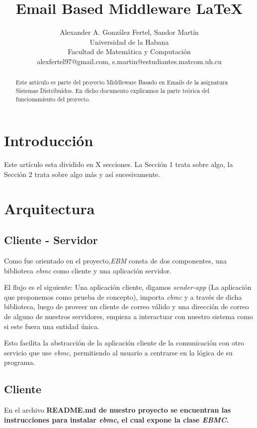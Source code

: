 \documentclass[a4paper]{article}
\title{Email Based Middleware \LaTeX}
\author{Alexander A. González Fertel, Sandor Martín \\
  \small Universidad de la Habana\\
  \small Facultad de Matemática y Computación\\
  \small alexfertel97@gmail.com, s.martin@estudiantes.matcom.uh.cu
  \date{}
}
\begin{document}
\maketitle

\begin{abstract}
	
Este artículo es parte del proyecto Middleware Basado en Emails de la asignatura Sistemas Distribuidos.
En dicho documento explicamos la parte teórica del funcionamiento del proyecto.

\end{abstract}

\section{Introducci\'on}

Este artículo esta dividido en X secciones. La Sección 1 trata sobre algo, la Sección 2 trata sobre algo más y así sucesivamente.

\section{Arquitectura}
	\subsection{Cliente - Servidor}
	Como fue orientado en el proyecto,\emph{EBM} consta de dos componentes, una biblioteca \emph{ebmc} como cliente y una aplicación servidor.
	
	El flujo es el siguiente: Una aplicación cliente, digamos \emph{sender-app} (La aplicación que proponemos como prueba de concepto), importa \emph{ebmc} y a través de dicha biblioteca, luego de proveer un cliente de correo válido y una dirección de correo de alguno de nuestros servidores, empieza a interactuar con nuestro sistema como si este fuera una entidad única.
	
	Esto facilita la abstracción de la aplicación cliente de la comunicación con otro servicio que use \emph{ebmc}, permitiendo al usuario a centrarse en la lógica de su programa.
	
	\subsection{Cliente}
	En el archivo \bfseries{README.md} de nuestro proyecto se encuentran las instrucciones para instalar \emph{ebmc}, el cual expone la clase \emph{EBMC}.
	
\end{document}
